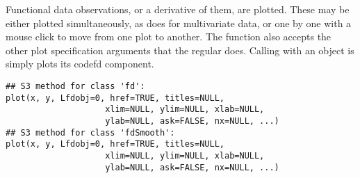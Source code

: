\begin{Description}\relax
Functional data observations, or a derivative of them, are plotted.
These may be either plotted simultaneously, as  does for
multivariate data, or one by one with a mouse click to move from one
plot to another.  The function also accepts the other plot
specification arguments that the regular  does.  Calling
 with an  object is simply plots its
code{fd} component.
\end{Description}
\begin{Usage}
\begin{verbatim}
## S3 method for class 'fd':
plot(x, y, Lfdobj=0, href=TRUE, titles=NULL,
                    xlim=NULL, ylim=NULL, xlab=NULL,
                    ylab=NULL, ask=FALSE, nx=NULL, ...)
## S3 method for class 'fdSmooth':
plot(x, y, Lfdobj=0, href=TRUE, titles=NULL,
                    xlim=NULL, ylim=NULL, xlab=NULL,
                    ylab=NULL, ask=FALSE, nx=NULL, ...)
\end{verbatim}
\end{Usage}
